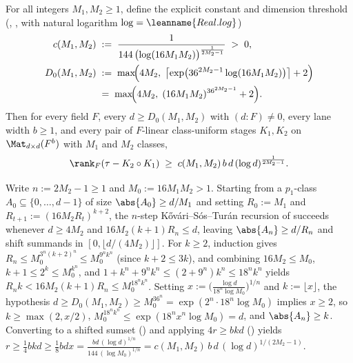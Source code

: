 \begin{theorem}\label{thm:2b}
For all integers $M_1, M_2 \ge 1$, define the explicit constant and dimension threshold
(, , with natural logarithm
$\log = \leanname{Real.log}$)
\begin{align*}
  c(M_1, M_2) &\;:=\; \frac{1}{144\,\bigl(\log(16 M_1 M_2)\bigr)^{\frac{1}{2M_2 - 1}}} \;>\; 0, \\
  D_0(M_1, M_2) &\;:=\; \max\!\Bigl(4M_2,\; \bigl\lceil \exp\bigl(36^{2M_2-1}\log(16 M_1 M_2)\bigr)\bigr\rceil + 2\Bigr) \\
  &\;=\; \max\!\Bigl(4M_2,\; (16 M_1 M_2)^{36^{2M_2 - 1}} + 2\Bigr).
\end{align*}
Then for every field $F$, every $d \ge D_0(M_1,M_2)$ with $(d : F) \ne 0$, every lane width
$b \ge 1$, and every pair of $F$-linear class-uniform stages $K_1, K_2$ on $\Mat_{d\times d}(F^b)$
with $M_1$ and $M_2$ classes,
\[
  \rank_F(\tau - K_2 \circ K_1)
  \;\ge\;
  c(M_1, M_2)\,b\,d\,(\log d)^{\frac{1}{2M_2 - 1}}.
\]
\end{theorem}
\begin{outline}
Write $n := 2M_2 - 1 \ge 1$ and $M_0 := 16 M_1 M_2 > 1$. Starting from a $p_1$-class
$A_0 \subseteq \{0, \dots, d - 1\}$ of size $\abs{A_0} \ge d / M_1$ and setting $R_0 := M_1$ and
$R_{t+1} := (16 M_2 R_t)^{k+2}$, the $n$-step K\H{o}v\'ari--S\'os--Tur\'an recursion of
 succeeds whenever $d \ge 4M_2$ and $16 M_2(k + 1) R_n \le d$, leaving
$\abs{A_n} \ge d / R_n$ and shift summands in $[0, \lfloor d/(4M_2)\rfloor]$. For $k \ge 2$,
induction gives $R_n \le M_0^{3^n(k+2)^n} \le M_0^{9^n k^n}$ (since $k + 2 \le 3k$), and combining
$16 M_2 \le M_0$, $k + 1 \le 2^k \le M_0^{k^n}$, and $1 + k^n + 9^n k^n \le (2 + 9^n)k^n \le
18^n k^n$ yields $R_n k < 16 M_2(k + 1) R_n \le M_0^{18^n k^n}$. Setting
$x := \bigl(\frac{\log d}{18^n \log M_0}\bigr)^{1/n}$ and $k := \lfloor x\rfloor$, the hypothesis
$d \ge D_0(M_1, M_2) \ge M_0^{36^n} = \exp(2^n \cdot 18^n \log M_0)$ implies $x \ge 2$, so
$k \ge \max(2, x/2)$, $M_0^{18^n k^n} \le \exp(18^n x^n \log M_0) = d$, and $\abs{A_n} \ge k$.
Converting to a shifted sumset () and applying $4r \ge b k d$
() yields
$r \ge \frac{1}{4} b k d \ge \frac{1}{8} b d x =
\frac{b d\,(\log d)^{1/n}}{144\,(\log M_0)^{1/n}} = c(M_1, M_2)\,b\,d\,(\log d)^{1/(2M_2 - 1)}$.
\end{outline}

